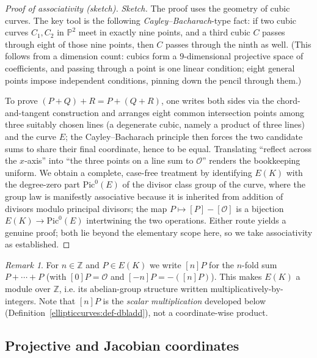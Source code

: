 \documentclass[11pt,a4paper]{article}
\theoremstyle{definition}
\theoremstyle{remark}
\newtheorem{remark}[theorem]{Remark}
\newcommand{\Z}{\ensuremath{\mathbb{Z}}}
\begin{document}
\begin{proof}[Proof of associativity (sketch)]
\emph{Sketch.} The proof uses the geometry of cubic curves. The key tool is the following \emph{Cayley--Bacharach}-type fact: if two cubic curves \(C_1, C_2\) in \(\mathbb{P}^2\) meet in exactly nine points, and a third cubic \(C\) passes through eight of those nine points, then \(C\) passes through the ninth as well. (This follows from a dimension count: cubics form a \(9\)-dimensional projective space of coefficients, and passing through a point is one linear condition; eight general points impose independent conditions, pinning down the pencil through them.)

To prove \((P + Q) + R = P + (Q + R)\), one writes both sides via the chord-and-tangent construction and arranges eight common intersection points among three suitably chosen lines (a degenerate cubic, namely a product of three lines) and the curve \(E\); the Cayley--Bacharach principle then forces the two candidate sums to share their final coordinate, hence to be equal. Translating ``reflect across the \(x\)-axis'' into ``the three points on a line sum to \(\mathcal{O}\)'' renders the bookkeeping uniform. We obtain a complete, case-free treatment by identifying \(E(K)\) with the degree-zero part \(\mathrm{Pic}^0(E)\) of the divisor class group of the curve, where the group law is manifestly associative because it is inherited from addition of divisors modulo principal divisors; the map \(P \mapsto [P] - [\mathcal{O}]\) is a bijection \(E(K) \to \mathrm{Pic}^0(E)\) intertwining the two operations. Either route yields a genuine proof; both lie beyond the elementary scope here, so we take associativity as established.
\end{proof}

\begin{remark}\label{ellipticcurves:rem-notation}
For \(n \in \Z\) and \(P \in E(K)\) we write \([n]P\) for the \(n\)-fold sum \(P + \cdots + P\) (with \([0]P = \mathcal{O}\) and \([-n]P = -([n]P)\)). This makes \(E(K)\) a module over \(\Z\), i.e. its abelian-group structure written multiplicatively-by-integers. Note that \([n]P\) is the \emph{scalar multiplication} developed below (Definition~\ref{ellipticcurves:def-dbladd}), not a coordinate-wise product.
\end{remark}

\subsection{Projective and Jacobian coordinates}
\end{document}
